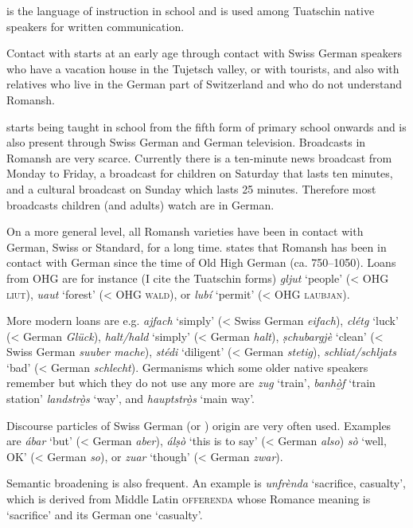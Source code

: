  is the language of instruction in school and is used among Tuatschin native speakers for written communication.

Contact with  starts at an early age through contact with Swiss German speakers who have a vacation house in the Tujetsch valley, or with tourists, and also with relatives who live in the German part of Switzerland and who do not understand Romansh.

 starts being taught in school from the fifth form of primary school onwards and is also present through Swiss German and German television. Broadcasts in Romansh are very scarce. Currently there is a ten-minute news broadcast from Monday to Friday, a broadcast for children on Saturday that lasts ten minutes, and a cultural broadcast on Sunday which lasts 25 minutes. Therefore most broadcasts children (and adults) watch are in German.

On a more general level, all Romansh varieties have been in contact with German, Swiss or Standard, for a long time. \citet[176--181]{Liver2010} states that Romansh has been in contact with German since the time of Old High German (ca. 750--1050). Loans from OHG are for instance (I cite the Tuatschin forms) \textit{gljut} `people' (< OHG \textsc{liut}), \textit{uaut} `forest' (< OHG \textsc{wald}), or \textit{lubí} `permit' (< OHG \textsc{laubjan}).

More modern loans are e.g. \textit{ajfach} `simply' (< Swiss German \textit{eifach}), \textit{clétg} `luck' (< German \textit{Glück}), \textit{halt/hald} `simply' (< German \textit{halt}), \textit{ṣchubargjè} `clean' (< Swiss German \textit{suuber mache}), \textit{stédi} `diligent' (< German \textit{stetig}), \textit{schliat/schljats} `bad' (< German \textit{schlecht}). Germanisms which some older native speakers remember but which they do not use any more are \textit{zug} `train', \textit{banhò̱f} `train station' \textit{landstrò̱s} `way', and \textit{hauptstrò̱s} `main way'.

Discourse particles of Swiss German (or ) origin are very often used. Examples are \textit{ábar} `but' (< German \textit{aber}), \textit{álṣò} `this is to say' (< German \textit{also}) \textit{sò} `well, OK' (< German \textit{so}), or \textit{zuar} `though' (< German \textit{zwar}).

Semantic broadening is also frequent. An example is \textit{unfrènda} `sacrifice, casualty', which is derived from Middle Latin \textsc{offerenda} \citep[1283]{Decurtins2012} whose Romance meaning is `sacrifice' and its German one `casualty'.


